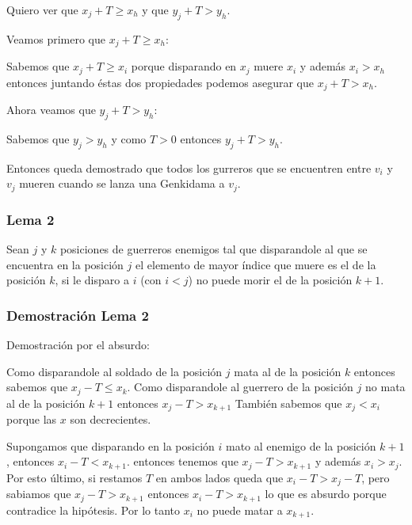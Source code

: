     			Quiero ver que $x_{j} + T \geqslant x_{h}$ y que $y_{j} + T > y_{h}$.

    			Veamos primero que $x_{j} + T \geqslant x_{h}$:

    			Sabemos que $x_{j} + T \geqslant x_{i}$ porque disparando en $x_{j}$ muere $x_{i}$ y además $x_{i} > x_{h}$ entonces juntando éstas dos propiedades podemos asegurar que $x_{j} + T > x_{h}$.

    			Ahora veamos que $y_{j} + T > y_{h}$:

    			Sabemos que $y_{j} > y_{h}$ y como $T > 0$ entonces $y_{j} + T > y_{h}$.

    			Entonces queda demostrado que todos los gurreros que se encuentren entre $v_{i}$ y $v_{j}$ mueren cuando se lanza una Genkidama a $v_{j}$.

    		\subsubsection*{Lema 2}

    			Sean $j$ y $k$ posiciones de guerreros enemigos tal que disparandole al que se encuentra en la posición $j$ el elemento de mayor índice que muere es el de la posición $k$, si le disparo a $i$ (con $i < j$) no puede morir el de la posición $k+1$.


    		\subsubsection*{Demostración Lema 2}
    			Demostración por el absurdo:

    			Como disparandole al soldado de la posición $j$ mata al de la posición $k$ entonces sabemos que $x_{j} - T \leq x_{k}$.
    			Como disparandole al guerrero de la posición $j$ no mata al de la posición $k+1$ entonces $x_{j} - T > x_{k+1}$
    			También sabemos que $x_{j} < x_{i}$ porque las $x$ son decrecientes.

    			Supongamos que disparando en la posición $i$ mato al enemigo de la posición $k+1$, entonces $x_{i} - T < x_{k+1}$.
    			entonces tenemos que $x_{j} - T > x_{k+1}$ y además $x_{i} > x_{j}$. Por esto último, si restamos $T$ en ambos lados queda que $x_{i} - T > x_{j} - T$, pero sabiamos que $x_{j} - T > x_{k+1}$ entonces $x_{i} - T > x_{k+1}$ lo que es absurdo porque contradice la hipótesis. 
    			Por lo tanto $x_{i}$ no puede matar a $x_{k+1}$. \\
    			\\
    			\\


